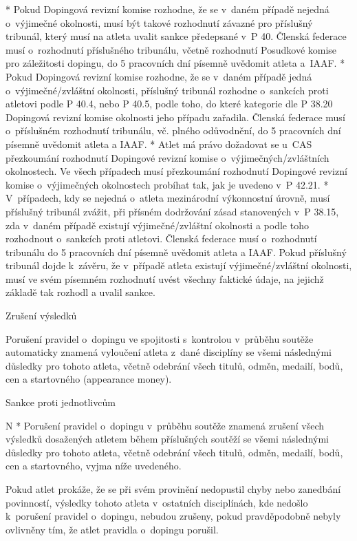 * Pokud Dopingová revizní komise rozhodne, že se v~daném případě nejedná o~výjimečné okolnosti, musí být takové rozhodnutí závazné pro příslušný tribunál, který musí na atleta uvalit sankce předepsané v~P 40. Členská federace musí o~rozhodnutí příslušného tribunálu, včetně rozhodnutí Posudkové komise pro záležitosti dopingu, do 5 pracovních dní písemně uvědomit atleta a~IAAF.
* Pokud Dopingová revizní komise rozhodne, že se v~daném případě jedná o~výjimečné/zvláštní okolnosti, příslušný tribunál rozhodne o~sankcích proti atletovi podle P 40.4, nebo P 40.5, podle toho, do které kategorie dle P 38.20 Dopingová revizní komise okolnosti jeho případu zařadila. Členská federace musí o~příslušném rozhodnutí tribunálu, vč. plného odůvodnění, do 5 pracovních dní písemně uvědomit atleta a IAAF.
* Atlet má právo dožadovat se u~CAS přezkoumání rozhodnutí Dopingové revizní komise o~výjimečných/zvláštních okolnostech. Ve všech případech musí přezkoumání rozhodnutí Dopingové revizní komise o~výjimečných okolnostech probíhat tak, jak je uvedeno v~P 42.21.
* V~případech, kdy se nejedná o~atleta mezinárodní výkonnostní úrovně, musí příslušný tribunál zvážit, při přísném dodržování zásad stanovených v~P 38.15, zda v~daném případě existují výjimečné/zvláštní okolnosti a podle toho rozhodnout o~sankcích proti atletovi. Členská federace musí o~rozhodnutí tribunálu do 5 pracovních dní písemně uvědomit atleta a IAAF. Pokud příslušný tribunál dojde k~závěru, že v~případě atleta existují výjimečné/zvláštní okolnosti, musí ve svém písemném rozhodnutí uvést všechny faktické údaje, na jejichž základě tak rozhodl a uvalil sankce.
\enditems

\secc Zrušení výsledků

Porušení pravidel o~dopingu ve spojitosti s~kontrolou v~průběhu soutěže automaticky znamená vyloučení atleta z~dané disciplíny se všemi následnými důsledky pro tohoto atleta, včetně odebrání všech titulů, odměn, medailí, bodů, cen a startovného (appearance money).

\secc Sankce proti jednotlivcům

\begitems \style N
* Porušení pravidel o~dopingu v~průběhu soutěže znamená zrušení všech výsledků dosažených atletem během příslušných soutěží se všemi následnými důsledky pro tohoto atleta, včetně odebrání všech titulů, odměn, medailí, bodů, cen a startovného, vyjma níže uvedeného.

Pokud atlet prokáže, že se při svém provinění nedopustil chyby nebo zanedbání povinností, výsledky tohoto atleta v~ostatních disciplínách, kde nedošlo k~porušení pravidel o~dopingu, nebudou zrušeny, pokud pravděpodobně nebyly ovlivněny tím, že atlet pravidla o~dopingu porušil.

